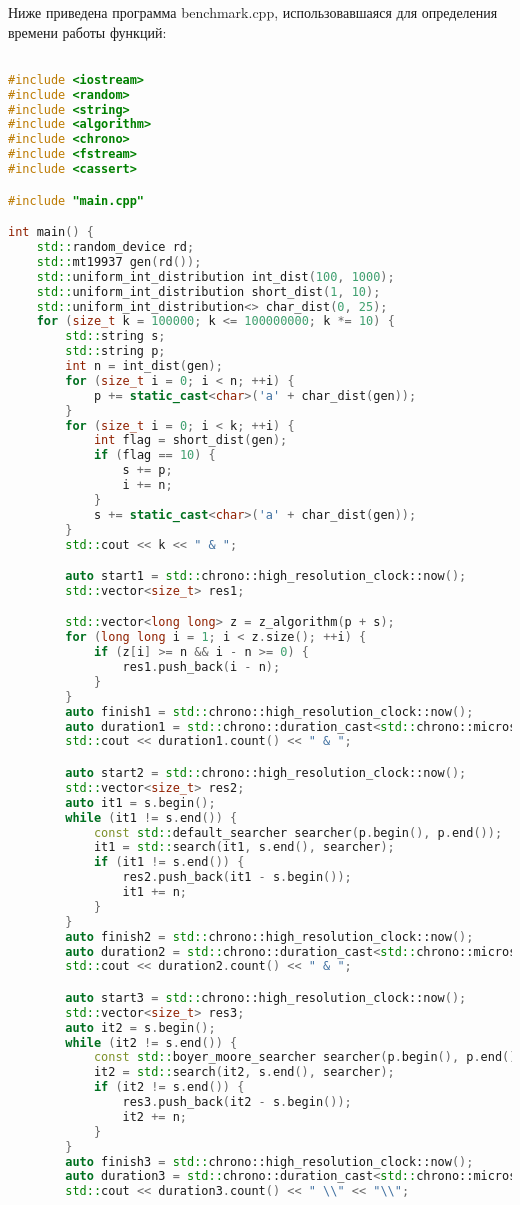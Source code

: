\documentclass[12pt]{article}
\begin{document}
Ниже приведена программа benchmark.cpp, использовавшаяся для определения времени работы функций:

\begin{lstlisting}[language=C++]

#include <iostream>
#include <random>
#include <string>
#include <algorithm>
#include <chrono>
#include <fstream>
#include <cassert>

#include "main.cpp"

int main() {
    std::random_device rd;
    std::mt19937 gen(rd());
    std::uniform_int_distribution int_dist(100, 1000);
    std::uniform_int_distribution short_dist(1, 10);
    std::uniform_int_distribution<> char_dist(0, 25);
    for (size_t k = 100000; k <= 100000000; k *= 10) {
        std::string s;
        std::string p;
        int n = int_dist(gen);
        for (size_t i = 0; i < n; ++i) {
            p += static_cast<char>('a' + char_dist(gen));
        }
        for (size_t i = 0; i < k; ++i) {
            int flag = short_dist(gen);
            if (flag == 10) {
                s += p;
                i += n;
            }
            s += static_cast<char>('a' + char_dist(gen));
        }
        std::cout << k << " & ";

        auto start1 = std::chrono::high_resolution_clock::now();
        std::vector<size_t> res1;

        std::vector<long long> z = z_algorithm(p + s);
        for (long long i = 1; i < z.size(); ++i) {
            if (z[i] >= n && i - n >= 0) {
                res1.push_back(i - n);
            }
        }
        auto finish1 = std::chrono::high_resolution_clock::now();
        auto duration1 = std::chrono::duration_cast<std::chrono::microseconds>(finish1 - start1);
        std::cout << duration1.count() << " & ";

        auto start2 = std::chrono::high_resolution_clock::now();
        std::vector<size_t> res2;
        auto it1 = s.begin();
        while (it1 != s.end()) {
            const std::default_searcher searcher(p.begin(), p.end());
            it1 = std::search(it1, s.end(), searcher);
            if (it1 != s.end()) {
                res2.push_back(it1 - s.begin());
                it1 += n;
            }
        }
        auto finish2 = std::chrono::high_resolution_clock::now();
        auto duration2 = std::chrono::duration_cast<std::chrono::microseconds>(finish2 - start2);
        std::cout << duration2.count() << " & ";

        auto start3 = std::chrono::high_resolution_clock::now();
        std::vector<size_t> res3;
        auto it2 = s.begin();
        while (it2 != s.end()) {
            const std::boyer_moore_searcher searcher(p.begin(), p.end());
            it2 = std::search(it2, s.end(), searcher);
            if (it2 != s.end()) {
                res3.push_back(it2 - s.begin());
                it2 += n;
            }
        }
        auto finish3 = std::chrono::high_resolution_clock::now();
        auto duration3 = std::chrono::duration_cast<std::chrono::microseconds>(finish3 - start3);
        std::cout << duration3.count() << " \\" << "\\";


\end{lstlisting}
\end{document}
